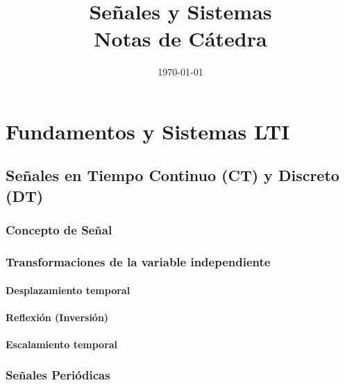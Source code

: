 \documentclass[11pt,a4paper,openany]{book}
\title{Señales y Sistemas\\ \Large Notas de Cátedra}
\author{}
\date{\today}
\begin{document}
	
	\maketitle
	\tableofcontents
	
	\part{Fundamentos y Sistemas LTI}
	
	
	\chapter{Señales en Tiempo Continuo (CT) y Discreto (DT)}
	
	
	\section{Concepto de Señal}
	
	\section{Transformaciones de la variable independiente}
	
	\subsection{Desplazamiento temporal}
	
	\subsection{Reflexión (Inversión)}
	
	\subsection{Escalamiento temporal}
	
	\section{Señales Periódicas}
	
\end{document}

